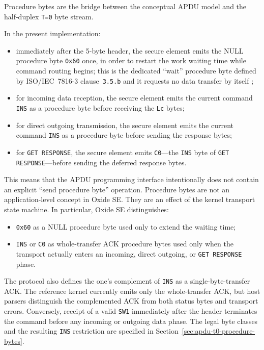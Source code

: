 Procedure bytes are the bridge between the conceptual APDU model and the
half-duplex \texttt{T=0} byte stream.

In the present implementation:
\begin{itemize}
\item immediately after the 5-byte header, the secure element emits the
  NULL procedure byte \texttt{0x60} once, in order to restart the work
  waiting time while command routing begins; this is the dedicated
  ``wait'' procedure byte defined by ISO/IEC~7816-3
  clause~\texttt{3.5.b} and it requests no data transfer by itself
  \cite{iso7816-3};
\item for incoming data reception, the secure element emits the current
  command \texttt{INS} as a procedure byte before receiving the
  \texttt{Lc} bytes;
\item for direct outgoing transmission, the secure element emits the
  current command \texttt{INS} as a procedure byte before sending the
  response bytes;
\item for \texttt{GET RESPONSE}, the secure element emits
  \texttt{C0}---the \texttt{INS} byte of \texttt{GET RESPONSE}---before
  sending the deferred response bytes.
\end{itemize}

This means that the APDU programming interface intentionally does not
contain an explicit ``send procedure byte'' operation. Procedure bytes
are not an application-level concept in Oxide SE. They are an effect of
the kernel transport state machine. In particular, Oxide SE distinguishes:
\begin{itemize}
\item \texttt{0x60} as a NULL procedure byte used only to extend the
  waiting time;
\item \texttt{INS} or \texttt{C0} as whole-transfer ACK procedure bytes used only when
  the transport actually enters an incoming, direct outgoing, or
  \texttt{GET RESPONSE} phase.
\end{itemize}

The protocol also defines the one's complement of \texttt{INS} as a
single-byte-transfer ACK. The reference kernel currently emits only the
whole-transfer ACK, but host parsers distinguish the complemented ACK
from both status bytes and transport errors. Conversely, receipt of a
valid \texttt{SW1} immediately after the header terminates the command
before any incoming or outgoing data phase. The legal byte classes and
the resulting \texttt{INS} restriction are specified in
Section~\ref{sec:apdu-t0-procedure-bytes}.

